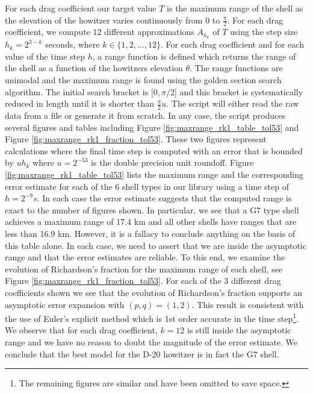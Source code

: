 \documentclass[runningheads]{llncs}
\begin{document}
For each drag coefficient our target value $T$ is the maximum range of the shell as the elevation of the howitzer varies continuously from $0$ to $\frac{\pi}{2}$. For each drag coefficient, we compute $12$ different approximations $A_{h_k}$ of $T$ using the step size $h_k = 2^{3-k}$ seconds, where $k \in \{1,2,\dots,12\}$.
For each drag coefficient and for each value of the time step $h$, a range function is defined which returns the range of the shell as a function of the howitzers elevation $\theta$.
The range functions are unimodal and the maximum range is found using the golden section search algorithm.
The initial search bracket is $[0,\pi/2$] and this bracket is systematically reduced in length until it is shorter than $\frac{\pi}{2}u$.
The script will either read the raw data from a file or generate it from scratch. In any case, the script produces several figures and tables including Figure \ref{fig:maxrange_rk1_table_tol53} and Figure \ref{fig:maxrange_rk1_fraction_tol53}. These two figures represent calculations where the final time step is computed with an error that is bounded by $u h_{k}$ where $u = 2^{-53}$ is the double precision unit roundoff. Figure \ref{fig:maxrange_rk1_table_tol53} lists the maximum range and the corresponding error estimate for each of the 6 shell types in our library using a time step of $h = 2^{-9} s$. In each case the error estimate suggests that the computed range is exact to the number of figures shown. In particular, we see that a G7 type shell achieves a maximum range of 17.4 km and all other shells have ranges that are less than 16.9 km. However, it is a fallacy to conclude anything on the basis of this table alone. In each case, we need to assert that we are inside the asymptotic range and that the error estimates are reliable. To this end, we examine the evolution of Richardson's fraction for the maximum range of each shell, see Figure \ref{fig:maxrange_rk1_fraction_tol53}. For each of the 3 different drag coefficients shown we see that the evolution of Richardson's fraction supports an asymptotic error expansion with $(p,q) = (1,2)$. This result is consistent with the use of Euler's explicit method which is 1st order accurate in the time step\footnote{The remaining figures are similar and have been omitted to save space.}. We observe that for each drag coefficient, $k=12$ is still inside the asymptotic range and we have no reason to doubt the magnitude of the error estimate. We conclude that the best model for the D-20 howitzer is in fact the G7 shell.
\end{document}
